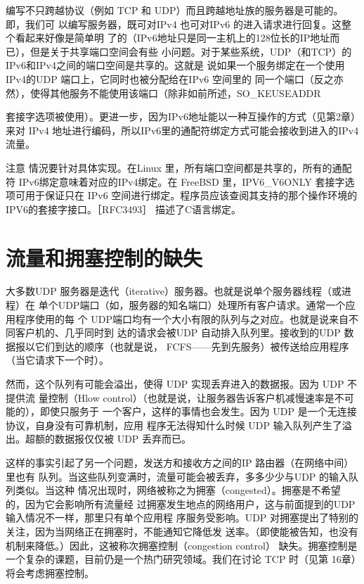 编写不只跨越协议（例如 TCP 和 UDP）而且跨越地址族的服务器是可能的。即，我们可
以编写服务器，既可对IPv4 也可对IPv6 的进入请求进行回复。这整个看起来好像是简单明
了的（IPv6地址只是同一主机上的128位长的IP地址而已），但是关于共享端口空间会有些
小问题。对于某些系统，UDP（和TCP）的IPv6和IPv4之间的端口空间是共享的。这就是
说如果一个服务绑定在一个使用IPv4的UDP 端口上，它同时也被分配给在IPv6 空间里的
同一个端口（反之亦然），使得其他服务不能使用该端口（除非如前所述，SO\_KEUSEADDR

套接字选项被使用）。更进一步，因为IPv6地址能以一种互操作的方式（见第2章）来对
IPv4 地址进行编码，所以IPv6里的通配符绑定方式可能会接收到进入的IPv4流量。

注意 情況要针对具体实现。在Linux 里，所有端口空间都是共享的，所有的通配
符 IPv6绑定意味着对应的IPv4绑定。在 FreeBSD 里，IPV6\_V6ONLY 套接字选
项可用于保证只在 IPv6 空间进行绑定。程序员应该查阅其支持的那个操作环境的
IPV6的套接字接口。［RFC3493］ 描述了C语言绑定。

\section{流量和拥塞控制的缺失}

大多数UDP 服务器是迭代（iterative）服务器。也就是说单个服务器线程（或进程）在
单个UDP端口（如，服务器的知名端口）处理所有客户请求。通常一个应用程序使用的每
个 UDP端口均有一个大小有限的队列与之对应。也就是说来自不同客户机的、几乎同时到
达的请求会被UDP 自动排入队列里。接收到的UDP 数据报以它们到达的顺序（也就是说，
FCFS——先到先服务）被传送给应用程序（当它请求下一个时）。

然而，这个队列有可能会溢出，使得 UDP 实现丢弃进入的数据报。因为 UDP 不提供流
量控制（Hlow control）（也就是说，让服务器告诉客户机减慢速率是不可能的），即使只服务于
一个客户，这样的事情也会发生。因为 UDP 是一个无连接协议，自身没有可靠机制，应用
程序无法得知什么时候 UDP 输入队列产生了溢出。超额的数据报仅仅被 UDP 丢弃而已。

这样的事实引起了另一个问题，发送方和接收方之间的IP 路由器（在网络中间）里也有
队列。当这些队列变满时，流量可能会被丢弃，多多少少与UDP 的输入队列类似。当这种
情况出现时，网络被称之为拥塞（congested）。拥塞是不希望的，因为它会影响所有流量经
过拥塞发生地点的网络用户，这与前面提到的UDP 输入情况不一样，那里只有单个应用程
序服务受影响。UDP 对拥塞提出了特别的关注，因为当网络正在拥塞时，不能通知它降低发
送率。（即使能被告知，也没有机制来降低。）因此，这被称次拥塞控制（congestion control）
缺失。拥塞控制是一个复杂的课题，目前仍是一个热门研究领域。我们在讨论 TCP 时（见第
16章）将会考虑拥塞控制。

